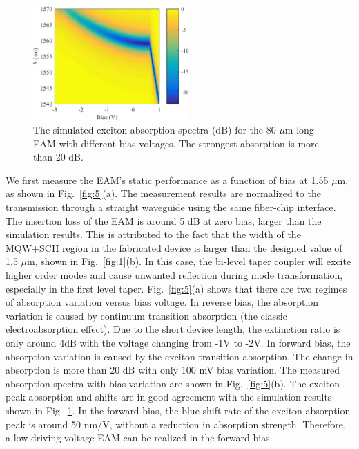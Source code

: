 \documentclass[aip,apl,reprint,a4paper]{revtex4-1}
\begin{document}
\begin{figure}
	\includegraphics[width=6cm]{figure/fig4.eps}%
	\caption{\label{fig:4} The simulated exciton absorption spectra (dB) for the 80 $\mu$m long EAM with different bias voltages. The strongest absorption is more than 20 dB.}
\end{figure}


We first measure the EAM’s static performance as a function of bias at 1.55 $\mu$m, as shown in Fig.~\ref{fig:5}(a). The measurement results are normalized to the transmission through a straight waveguide using the same fiber-chip interface. The insertion loss of the EAM is around 5 dB at zero bias, larger than the simulation results. This is attributed to the fact that the width of the MQW+SCH region in the fabricated device is larger than the designed value of 1.5 $\mu$m, shown in Fig.~\ref{fig:1}(b). In this case, the bi-level taper coupler will excite higher order modes and cause unwanted reflection during mode transformation, especially in the first level taper.\cite{huang2015ultracompact} Fig.~\ref{fig:5}(a) shows that there are two regimes of absorption variation versus bias voltage. In reverse bias, the absorption variation is caused by continuum transition absorption (the classic electroabsorption effect). Due to the short device length, the extinction ratio is only around 4dB with the voltage changing from -1V to -2V. In forward bias, the absorption variation is caused by the exciton transition absorption. The change in absorption is more than 20 dB with only 100 mV bias variation. The measured absorption spectra with bias variation are shown in Fig.~\ref{fig:5}(b). The exciton peak absorption and shifts are in good agreement with the simulation results shown in Fig.~\ref{fig:4}. In the forward bias, the blue shift rate of the exciton absorption peak is around 50 nm/V, without a reduction in absorption strength. Therefore, a low driving voltage EAM can be realized in the forward bias.
\end{document}

